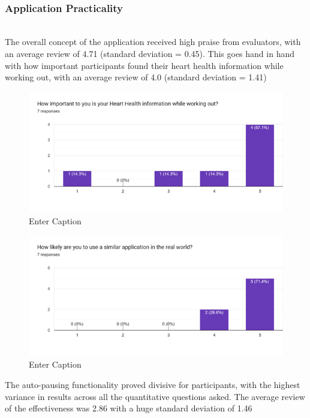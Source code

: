 \documentclass{l4proj}
\begin{document}
\noindent\mbox{}\\
\subsubsection{Application Practicality}
\noindent\mbox{}\\

The overall concept of the application received high praise from evaluators, with an average review of 4.71 (standard deviation = 0.45). This goes hand in hand with how important participants found their heart health information while working out, with an average review of 4.0 (standard deviation = 1.41)

\begin{figure}[h!]
    \centering
    \includegraphics[width=0.75\linewidth]{dissertation//dissImages/HeartImportant.png}
    \caption{Enter Caption}
    \label{fig:enter-label}
\end{figure}

\begin{figure}[h!]
    \centering
    \includegraphics[width=0.75\linewidth]{dissertation//dissImages/UseApplication.png}
    \caption{Enter Caption}
    \label{fig:enter-label}
\end{figure}


The auto-pausing functionality proved divisive for participants, with the highest variance in results across all the quantitative questions asked. The average review of the effectiveness was 2.86 with a huge standard deviation of 1.46
\end{document}
